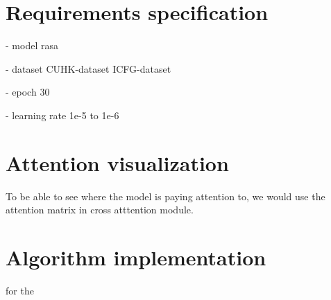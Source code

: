 \section{Requirements specification}

- model
rasa

- dataset 
CUHK-dataset
ICFG-dataset

- epoch
30

- learning rate 
1e-5 to 1e-6

\section{Attention visualization}
To be able to see where the model is paying attention to, we would use the attention matrix in cross atttention module.



\section{Algorithm implementation}

for the 